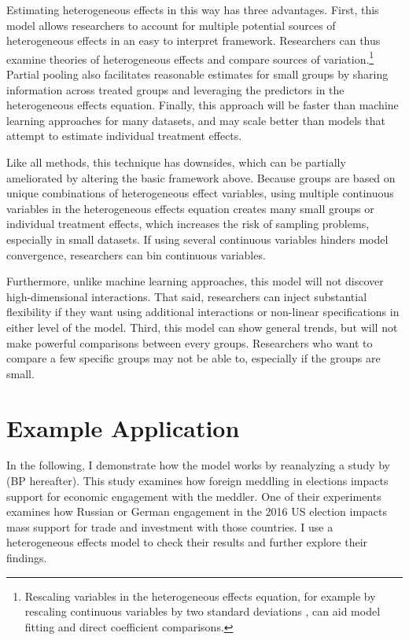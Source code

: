 \documentclass[12pt]{article}
\begin{document}
Estimating heterogeneous effects in this way has three advantages.
First, this model allows researchers to account for multiple potential sources of heterogeneous effects in an easy to interpret framework. 
Researchers can thus examine theories of heterogeneous effects and compare sources of variation.\footnote{Rescaling variables in the heterogeneous effects equation, for example by rescaling continuous variables by two standard deviations \citep{Gelman2008}, can aid model fitting and direct coefficient comparisons.} 
Partial pooling also facilitates reasonable estimates for small groups by sharing information across treated groups and leveraging the predictors in the heterogeneous effects equation. 
Finally, this approach will be faster than machine learning approaches for many datasets, and may scale better than models that attempt to estimate individual treatment effects.


Like all methods, this technique has downsides, which can be partially ameliorated by altering the basic framework above. 
Because groups are based on unique combinations of heterogeneous effect variables, using multiple continuous variables in the heterogeneous effects equation creates many small groups or individual treatment effects, which increases the risk of sampling problems, especially in small datasets. 
If using several continuous variables hinders model convergence, researchers can bin continuous variables.


Furthermore, unlike machine learning approaches, this model will not discover high-dimensional interactions. 
That said, researchers can inject substantial flexibility if they want using additional interactions or non-linear specifications in either level of the model. 
Third, this model can show general trends, but will not make powerful comparisons between every groups. 
Researchers who want to compare a few specific groups may not be able to, especially if the groups are small.



\section{Example Application} 


In the following, I demonstrate how the model works by reanalyzing a study by \citet{BushPrather2020} (BP hereafter). 
This study examines how foreign meddling in elections impacts support for economic engagement with the meddler. 
One of their experiments examines how Russian or German engagement in the 2016 US election impacts mass support for trade and investment with those countries.
I use a heterogeneous effects model to check their results and further explore their findings. 
\end{document}
